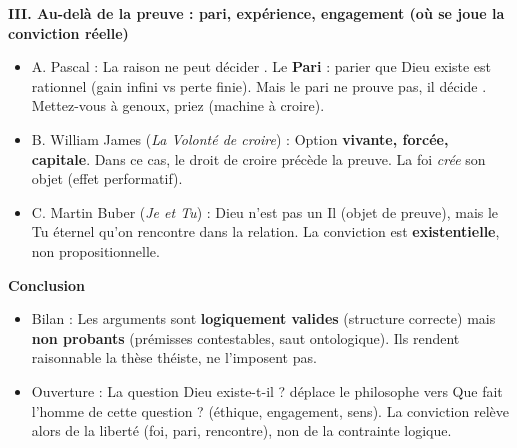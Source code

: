 \documentclass[11pt]{article}
\newcommand{\cle}[1]{{\popxbold\color{popdark}#1}}
\begin{document}
\begin{exoresolu}
\textbf{III. Au-delà de la preuve : pari, expérience, engagement (où se joue la \guillemotleft conviction \guillemotright réelle)}
\begin{itemize}
    \item A. Pascal : La raison \guillemotleft ne peut décider \guillemotright. Le \textbf{Pari} : parier que Dieu existe est rationnel (gain infini vs perte finie). Mais le pari ne \guillemotleft prouve \guillemotright pas, il \guillemotleft décide \guillemotright. \guillemotleft Mettez-vous à genoux, priez \guillemotright (machine à croire).
    \item B. William James (\emph{La Volonté de croire}) : Option \textbf{vivante, forcée, capitale}. Dans ce cas, le \guillemotleft droit de croire \guillemotright précède la preuve. La foi \emph{crée} son objet (effet performatif).
    \item C. Martin Buber (\emph{Je et Tu}) : Dieu n'est pas un \guillemotleft Il \guillemotright (objet de preuve), mais le \guillemotleft Tu éternel \guillemotright qu'on rencontre dans la relation. La \guillemotleft conviction \guillemotright est \textbf{existentielle}, non propositionnelle.
\end{itemize}

\textbf{Conclusion}
\begin{itemize}
    \item Bilan : Les arguments sont \textbf{logiquement valides} (structure correcte) mais \textbf{non probants} (prémisses contestables, saut ontologique). Ils \guillemotleft rendent raisonnable \guillemotright la thèse théiste, ne l'\guillemotleft imposent \guillemotright pas.
    \item Ouverture : La question \guillemotleft Dieu existe-t-il ? \guillemotright déplace le philosophe vers \guillemotleft Que fait l'homme de cette question ? \guillemotright (éthique, engagement, sens). La \guillemotleft conviction \guillemotright relève alors de la \cle{liberté} (foi, pari, rencontre), non de la contrainte logique.
\end{itemize}
\end{exoresolu}
\end{document}
